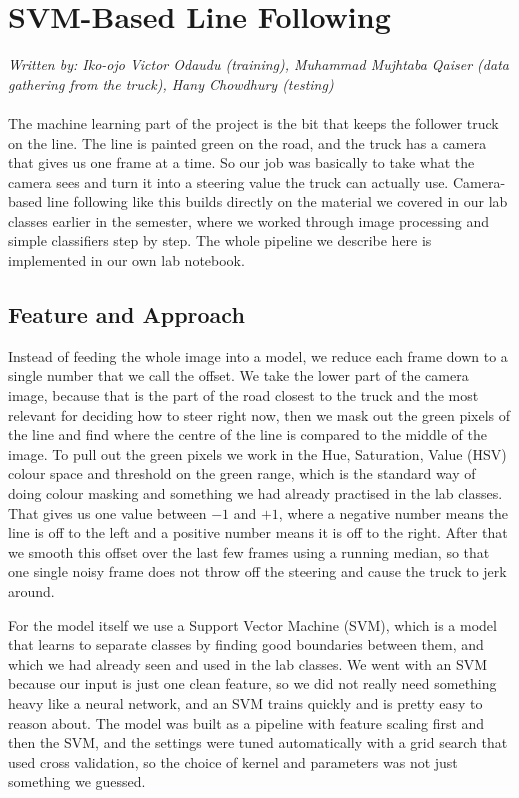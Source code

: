 \documentclass[english]{lni}
\begin{document}
\section{SVM-Based Line Following}
\textit{Written by: Iko-ojo Victor Odaudu (training), Muhammad Mujhtaba Qaiser (data gathering from the truck), Hany Chowdhury (testing)}
\\~\\
The machine learning part of the project is the bit that keeps the follower truck on the line. The line is painted green on the road, and the truck has a camera that gives us one frame at a time. So our job was basically to take what the camera sees and turn it into a steering value the truck can actually use. Camera-based line following like this builds directly on the material we covered in our lab classes earlier in the semester, where we worked through image processing and simple classifiers step by step. The whole pipeline we describe here is implemented in our own lab notebook.

\subsection{Feature and Approach}
Instead of feeding the whole image into a model, we reduce each frame down to a single number that we call the offset. We take the lower part of the camera image, because that is the part of the road closest to the truck and the most relevant for deciding how to steer right now, then we mask out the green pixels of the line and find where the centre of the line is compared to the middle of the image. To pull out the green pixels we work in the Hue, Saturation, Value (HSV) colour space and threshold on the green range, which is the standard way of doing colour masking and something we had already practised in the lab classes. That gives us one value between $-1$ and $+1$, where a negative number means the line is off to the left and a positive number means it is off to the right. After that we smooth this offset over the last few frames using a running median, so that one single noisy frame does not throw off the steering and cause the truck to jerk around.

For the model itself we use a Support Vector Machine (SVM), which is a model that learns to separate classes by finding good boundaries between them, and which we had already seen and used in the lab classes. We went with an SVM because our input is just one clean feature, so we did not really need something heavy like a neural network, and an SVM trains quickly and is pretty easy to reason about. The model was built as a pipeline with feature scaling first and then the SVM, and the settings were tuned automatically with a grid search that used cross validation, so the choice of kernel and parameters was not just something we guessed.
\end{document}
